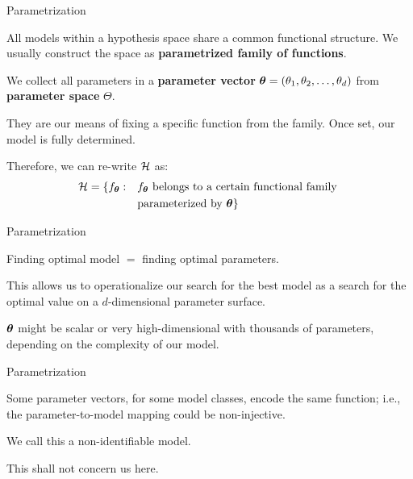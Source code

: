 \documentclass[11pt,compress,t,notes=noshow, xcolor=table]{beamer}
\begin{document}
\begin{framei}{Parametrization}  
\item All models within a hypothesis space share a common functional structure. We usually construct the space as \textbf{parametrized family of functions}.  
\item We collect all parameters in a \textbf{parameter vector} $\bm{\theta} = (\theta_1, \theta_2, \ldots, \theta_d)$ from \textbf{parameter space} $\Theta$.
\item They are our means of fixing a specific function from the family.
Once set, our model is fully determined.
\item Therefore, we can re-write $\mathcal{H}$ as:
\begin{equation*}
  \begin{split}
  \mathcal{H} = \{f_{\bm{\theta}}: \quad & f_{\bm{\theta}} \text{ belongs to a certain functional family } \\
  & \text{parameterized by } \bm{\theta}\}
  \end{split}
\end{equation*}
\end{framei}


\begin{framei}{Parametrization}
\item Finding optimal model $=$ finding optimal parameters.
\item This allows us to operationalize our search for the best model as a search for the optimal value on a $d$-dimensional parameter surface.
\item $\bm{\theta}$ might be scalar or very high-dimensional with thousands of parameters, depending on the complexity of our model.
\end{framei}


\begin{framei}{Parametrization}
\item Some parameter vectors, for some model classes, encode the same function; i.e., the parameter-to-model mapping could be non-injective. 
\item We call this a non-identifiable model.
\item This shall not concern us here. 
\end{framei}
\end{document}
